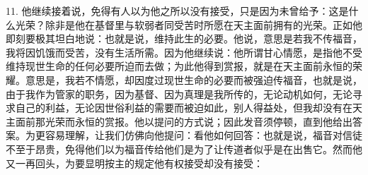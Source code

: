 11. 他继续接着说，免得有人以为他之所以没有接受，只是因为未曾给予：这是什么光荣？除非是他在基督里与软弱者同受苦时所愿在天主面前拥有的光荣。正如他即刻要极其坦白地说：也就是说，维持此生的必要。他说，意思是若我不传福音，我将因饥饿而受苦，没有生活所需。因为他继续说：他所谓甘心情愿，是指他不受维持现世生命的任何必要所迫而去做；为此他得到赏报，就是在天主面前永恒的荣耀。意思是，我若不情愿，却因度过现世生命的必要而被强迫传福音，也就是说，由于我作为管家的职务，因为基督、因为真理是我所传的，无论动机如何，无论寻求自己的利益，无论因世俗利益的需要而被迫如此，别人得益处，但我却没有在天主面前那光荣而永恒的赏报。他以提问的方式说；因此发音须停顿，直到他给出答案。为更容易理解，让我们仿佛向他提问：看他如何回答：也就是说，福音对信徒不至于昂贵，免得他们以为福音传给他们是为了让传道者似乎是在出售它。然而他又一再回头，为要显明按主的规定他有权接受却没有接受：\par

